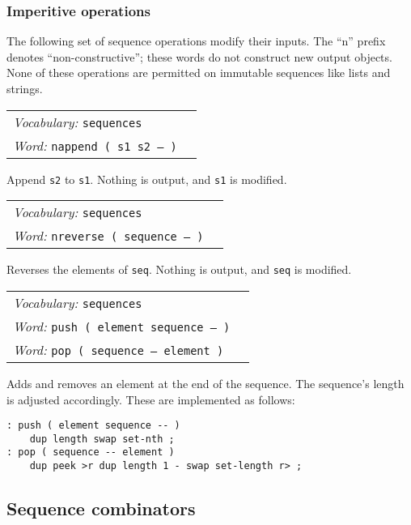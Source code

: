 \documentclass{book}
\newcommand{\vocabulary}[1]{\emph{Vocabulary:} \texttt{#1}&\\}
\newcommand{\ordinaryword}[2]{\index{\texttt{#1}}\emph{Word:} \texttt{#2}&\\}
\newcommand{\wordtable}[1]{

\begin{tabularx}{12cm}[t]{lX}
\hline
#1
\hline
\end{tabularx}

}
\begin{document}
\subsubsection{Imperitive operations}

The following set of sequence operations modify their inputs. The ``n'' prefix denotes ``non-constructive''; these words do not construct new output objects. None of these operations are permitted on immutable sequences like lists and strings.

\wordtable{
\vocabulary{sequences}
\ordinaryword{nappend}{nappend ( s1 s2 -- )}
}
Append \texttt{s2} to \texttt{s1}. Nothing is output, and \texttt{s1} is modified.
\wordtable{
\vocabulary{sequences}
\ordinaryword{nreverse}{nreverse ( sequence -- )}
}
Reverses the elements of \texttt{seq}. Nothing is output, and \texttt{seq} is modified.
\wordtable{
\vocabulary{sequences}
\ordinaryword{push}{push ( element sequence -- )}
\ordinaryword{pop}{pop ( sequence -- element )}
}

Adds and removes an element at the end of the sequence. The sequence's length is adjusted accordingly. These are implemented as follows:
\begin{verbatim}
: push ( element sequence -- )
    dup length swap set-nth ;
: pop ( sequence -- element )
    dup peek >r dup length 1 - swap set-length r> ;
\end{verbatim}

\subsection{Sequence combinators}
\end{document}
